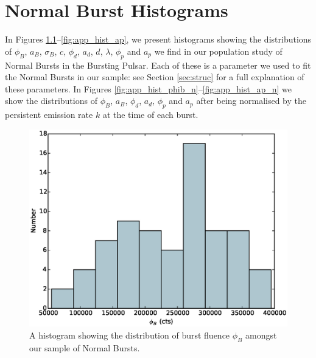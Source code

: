 \chapter{Normal Burst Histograms}
\label{app:hists}

\par In Figures \ref{fig:app_hist_phib}--\ref{fig:app_hist_ap}, we present histograms showing the distributions of $\phi_B$, $a_B$, $\sigma_B$, $c$, $\phi_d$, $a_d$, $d$, $\lambda$, $\phi_p$ and $a_p$ we find in our population study of Normal Bursts in the Bursting Pulsar.  Each of these is a parameter we used to fit the Normal Bursts in our sample: see Section \ref{sec:struc} for a full explanation of these parameters.  In Figures \ref{fig:app_hist_phib_n}--\ref{fig:app_hist_ap_n} we show the distributions of $\phi_B$, $a_B$, $\phi_d$, $a_d$, $\phi_p$ and $a_p$ after being normalised by the persistent emission rate $k$ at the time of each burst.

\begin{figure}
  \centering
  \includegraphics[width=.9\linewidth, trim={0cm 0 0cm 0},clip]{images/appendix_burst_aafluence_hist.eps}
  \caption[Histogram showing the distribution of $\phi_B$ amongst Normal Bursts.]{A histogram showing the distribution of burst fluence $\phi_B$ amongst our sample of Normal Bursts.}
  \label{fig:app_hist_phib}
\end{figure}

